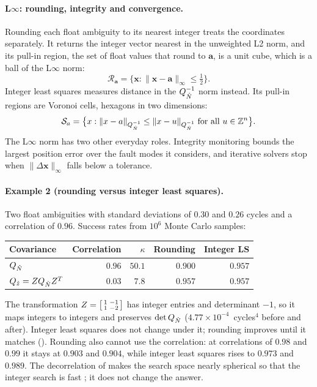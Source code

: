 \documentclass[main.tex]{subfiles}
\begin{document}
\paragraph{L$\infty$: rounding, integrity and convergence.}
Rounding each float ambiguity to its nearest integer treats the coordinates
separately.  It returns the integer vector nearest in the unweighted L2
norm, and its pull-in region, the set of float values that round to
$\bm{a}$, is a unit cube, which is a ball of the L$\infty$ norm:
\begin{equation}
\mathcal{R}_{\bm{a}} = \bigl\{\bm{x} :
  \lVert\bm{x}-\bm{a}\rVert_\infty \le \tfrac12\bigr\}.
\label{eq:la-pullin-round}
\end{equation}
Integer least squares measures distance in the $Q_{\hat N}^{-1}$ norm instead.
Its pull-in regions are Voronoi cells, hexagons in two dimensions:
\begin{equation}
\mathcal{S}_{a} = \bigl\{x :
  \lVert x-a\rVert_{Q_{\hat N}^{-1}} \le
  \lVert x-u\rVert_{Q_{\hat N}^{-1}}
  \ \text{for all } u\in\mathbb{Z}^n\bigr\}.
\label{eq:la-pullin-ils}
\end{equation}
The L$\infty$ norm has two other everyday roles.  Integrity monitoring
bounds the largest position error over the fault modes it considers, and
iterative solvers stop when $\lVert\Delta\bm{x}\rVert_\infty$ falls below a
tolerance.

\paragraph{Example 2 (rounding versus integer least squares).}
\label{la:ex2}%
Two float ambiguities with standard deviations of $0.30$ and $0.26$ cycles
and a correlation of $0.96$.  Success rates from $10^6$ Monte Carlo
samples:
\begin{center}
\small
\begin{tabular}{@{}lrrrr@{}}
\toprule
Covariance & Correlation & $\kappa$ & Rounding & Integer LS \\
\midrule
$Q_{\hat N}$ & $0.96$ & $50.1$ & $0.900$ & $0.957$ \\
$Q_{\hat z} = ZQ_{\hat N}Z^{T}$ & $0.03$ & $7.8$ & $0.957$ & $0.957$ \\
\bottomrule
\end{tabular}
\end{center}
The transformation
$Z = \left[\begin{smallmatrix} 1 & -1 \\ 1 & -2 \end{smallmatrix}\right]$
has integer entries and determinant $-1$, so it maps integers to integers
and preserves $\det Q_{\hat N}$ ($4.77\times10^{-4}$~cycles$^4$ before and
after).  Integer least squares does not change under it; rounding improves
until it matches ().  Rounding also cannot use the
correlation: at correlations of $0.98$ and $0.99$ it stays at $0.903$ and
$0.904$, while integer least squares rises to $0.973$ and $0.989$.  The
decorrelation of  makes the search space nearly spherical so that the
integer search is fast \cite{teunissen1995lambda}; it does not change the
answer.
\end{document}
